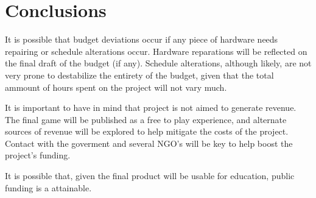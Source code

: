 \section{Conclusions}

It is possible that budget deviations occur if any piece of hardware needs repairing or schedule alterations occur. Hardware reparations will be reflected on the final draft of the budget (if any). Schedule alterations, although likely, are not very prone to destabilize the entirety of the budget, given that the total ammount of hours spent on the project will not vary much.  

It is important to have in mind that project is not aimed to generate revenue. The final game will be published as a free to play experience, and alternate sources of revenue will be explored to help mitigate the costs of the project. Contact with the goverment and several NGO's will be key to help boost the project's funding.

It is possible that, given the final product will be usable for education, public funding is a attainable.